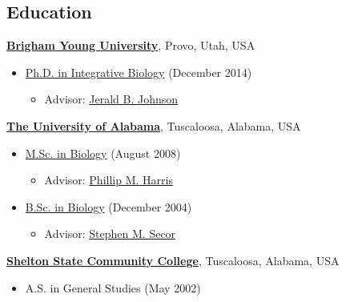 \documentclass[margin,line]{res}
\begin{document}
\begin{resume}
\section{\sc Education}
{\bf \href{https://www.byu.edu/}{Brigham Young University}}, Provo, Utah, USA\\
\vspace*{-.1in}
\begin{itemize}
\item[] \hspace*{-2mm}\href{https://biology.byu.edu/}{Ph.D. in Integrative Biology} (December 2014) %
\begin{itemize}
	\item Advisor: \href{https://lifesciences.byu.edu/directory/jerald-johnson/}{Jerald B. Johnson}
\end{itemize}
\end{itemize}
\vspace*{-.1in}
{\bf \href{https://www.ua.edu/}{The University of Alabama}}, Tuscaloosa, Alabama, USA\\
\vspace*{-.1in}
\begin{itemize}
\item[] \hspace*{-2mm}\href{https://bsc.ua.edu}{M.Sc. in Biology} (August 2008) %
\begin{itemize}
	\item Advisor: \href{https://bsc.ua.edu/profiles/phillip-m-harris/}{Phillip M. Harris}
\end{itemize}
\item[] \hspace*{-2mm}\href{https://bsc.ua.edu}{B.Sc. in Biology} (December 2004) %
\begin{itemize}
	\item Advisor: \href{https://bsc.ua.edu/profiles/stephen-m-secor/}{Stephen M. Secor}
\end{itemize}
\end{itemize}
\vspace*{-.1in}
{\bf \href{https://www.sheltonstate.edu/}{Shelton State Community College}}, Tuscaloosa, Alabama, USA\\
\vspace*{-.1in}
\begin{itemize}
\item[] \hspace*{-2mm}A.S. in General Studies (May 2002) %
\end{itemize}



\end{resume}
\end{document}
